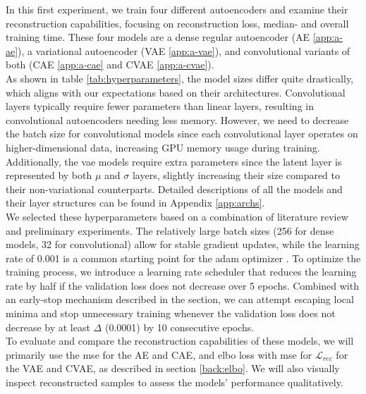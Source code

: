 In this first experiment, we train four different autoencoders and examine their reconstruction capabilities, focusing on reconstruction loss, median- and overall training time. These four models are a dense regular autoencoder (AE \ref{app:a-ae}), a variational autoencoder (VAE \ref{app:a-vae}), and convolutional variants of both (CAE \ref{app:a-cae} and CVAE \ref{app:a-cvae}). \\ 

As shown in table \ref{tab:hyperparameters}, the model sizes differ quite drastically, which aligns with our expectations based on their architectures. Convolutional layers typically require fewer parameters than linear layers, resulting in convolutional autoencoders needing less memory. However, we need to decrease the batch size for convolutional models since each convolutional layer operates on higher-dimensional data, increasing GPU memory usage during training. Additionally, the \acrshort{vae} models require extra parameters since the latent layer is represented by both $\mu$ and $\sigma$ layers, slightly increasing their size compared to their non-variational counterparts. Detailed descriptions of all the models and their layer structures can be found in Appendix \ref{app:archs}. \\

We selected these hyperparameters based on a combination of literature review and preliminary experiments. The relatively large batch sizes (256 for dense models, 32 for convolutional) allow for stable gradient updates, while the learning rate of 0.001 is a common starting point for the \acrshort{adam} optimizer \cite{kingma2017adam}. To optimize the training process, we introduce a learning rate scheduler that reduces the learning rate by half if the validation loss does not decrease over 5 epochs. Combined with an early-stop mechanism described in the section, we can attempt escaping local minima and stop unnecessary training whenever the validation loss does not decrease by at least $\Delta$ (0.0001) by 10 consecutive epochs. \\ 

To evaluate and compare the reconstruction capabilities of these models, we will primarily use the \acrshort{mse} for the AE and CAE, and  \acrshort{elbo} loss with \acrshort{mse} for $\mathcal{L}_{rec}$ for the VAE and CVAE, as described in section \ref{back:elbo}. We will also visually inspect reconstructed samples to assess the models' performance qualitatively.



